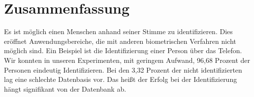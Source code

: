 \section{Zusammenfassung}
Es ist möglich einen Menschen anhand seiner Stimme zu identifizieren. Dies eröffnet Anwendungsbereiche, die mit anderen biometrischen Verfahren nicht möglich sind. Ein Beispiel ist die Identifizierung einer Person über das Telefon. Wir konnten in unseren Experimenten, mit geringem Aufwand, 96,68 Prozent der Personen eindeutig Identifizieren. Bei den 3,32 Prozent der nicht identifizierten lag eine schlechte Datenbasis vor. Das heißt der Erfolg bei der Identifizierung hängt signifikant von der Datenbank ab. %